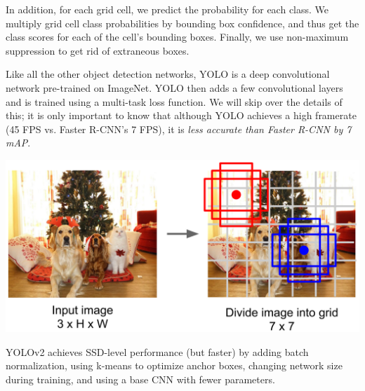 \documentclass{article}
\begin{document}
In addition, for each grid cell, we predict the probability for each class. We multiply grid cell class probabilities by bounding box confidence, and thus get the class scores for each of the cell's bounding boxes. Finally, we use non-maximum suppression to get rid of extraneous boxes.

Like all the other object detection networks, YOLO is a deep convolutional network pre-trained on ImageNet. YOLO then adds a few convolutional layers and is trained using a multi-task loss function. We will skip over the details of this; it is only important to know that although YOLO achieves a high framerate (45 FPS vs. Faster R-CNN's 7 FPS), it is \textit{less accurate than Faster R-CNN by 7 mAP}.

\begin{center}
\includegraphics[scale=0.35]{yologrid.PNG}
\end{center}

YOLOv2 achieves SSD-level performance (but faster) by adding batch normalization, using k-means to optimize anchor boxes, changing network size during training, and using a base CNN with fewer parameters.
 
\end{document}

